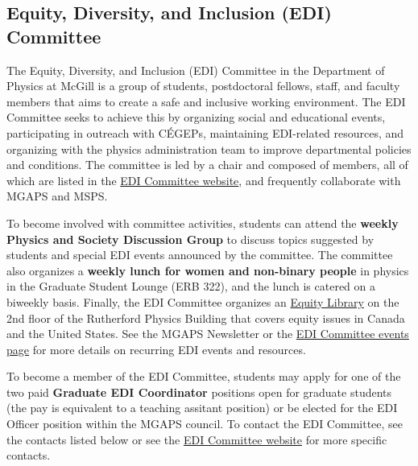 \subsection{Equity, Diversity, and Inclusion (EDI) Committee} 
The Equity, Diversity, and Inclusion (EDI) Committee in the Department of Physics at McGill is a group of students, postdoctoral fellows, staff, and faculty members that aims to create a safe and inclusive working environment. The EDI Committee seeks to achieve this by organizing social and educational events, participating in outreach with CÉGEPs, maintaining EDI-related resources, and organizing with the physics administration team to improve departmental policies and conditions. The committee is led by a chair and composed of members, all of which are listed in the \href{https://www.physics.mcgill.ca/edi/}{EDI Committee website}, and frequently collaborate with MGAPS and MSPS. 

To become involved with committee activities, students can attend the \textbf{weekly Physics and Society Discussion Group} to discuss topics suggested by students and special EDI events announced by the committee. The committee also organizes a \textbf{weekly lunch for women and non-binary people} in physics in the Graduate Student Lounge (ERB 322), and the lunch is catered on a biweekly basis. Finally, the EDI Committee organizes an \href{https://www.physics.mcgill.ca/edi/library.html}{Equity Library} on the 2nd floor of the Rutherford Physics Building that covers equity issues in Canada and the United States. See the MGAPS Newsletter or the \href{https://www.physics.mcgill.ca/edi/events.html}{EDI Committee events page} for more details on recurring EDI events and resources.

To become a member of the EDI Committee, students may apply for one of the two paid \textbf{Graduate EDI Coordinator} positions open for graduate students (the pay is equivalent to a teaching assitant position) or be elected for the EDI Officer position within the MGAPS council. To contact the EDI Committee, see the contacts listed below or see the \href{https://www.physics.mcgill.ca/edi/}{EDI Committee website} for more specific contacts.


